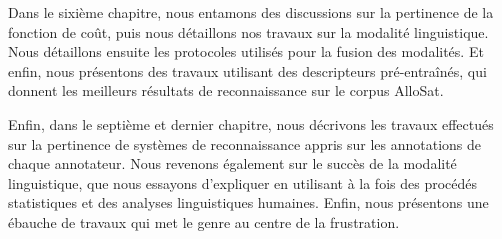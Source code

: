 Dans le sixième chapitre, nous entamons des discussions sur la pertinence de la fonction de coût, puis nous détaillons nos travaux sur la modalité linguistique. Nous détaillons ensuite les protocoles utilisés pour la fusion des modalités. Et enfin, nous présentons des travaux utilisant des descripteurs pré-entraînés, qui donnent les meilleurs résultats de reconnaissance sur le corpus AlloSat.

Enfin, dans le septième et dernier chapitre, nous décrivons les travaux effectués sur la pertinence de systèmes de reconnaissance appris sur les annotations de chaque annotateur. Nous revenons également sur le succès de la modalité linguistique, que nous essayons d'expliquer en utilisant à la fois des procédés statistiques et des analyses linguistiques humaines. Enfin, nous présentons une ébauche de travaux qui met le genre au centre de la frustration.
